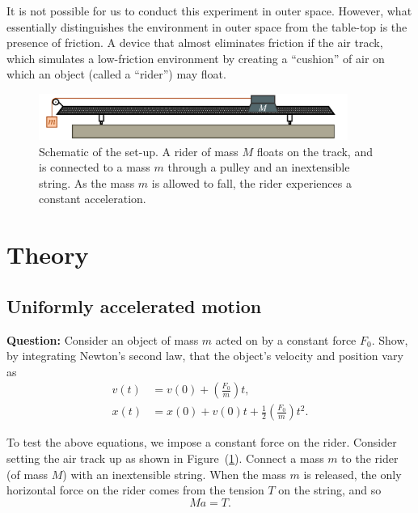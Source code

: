  It is not possible for us to conduct this experiment in outer space. However, what essentially distinguishes the environment in outer space from the table-top is the presence of friction. A device that almost eliminates friction if the air track, which simulates a low-friction environment by creating a ``cushion'' of air on which an object (called a ``rider'') may float. 
 
\begin{figure}[!htb]
     \centering
     \includegraphics[width=0.9\textwidth]{figs/airtrack/airtrack-setup.png}
     \caption{Schematic of the set-up. A rider of mass $M$ floats on the track, and is connected to a mass $m$ through a pulley and an inextensible string. As the mass $m$ is allowed to fall, the rider experiences a constant acceleration. }
     \label{fig:airtrack}
 \end{figure}

\section*{Theory}

\subsection*{Uniformly accelerated motion}

\begin{question}
    \textbf{Question:} Consider an object of mass $m$ acted on by a constant force $F_0$. Show, by integrating Newton's second law, that the object's velocity and position vary as
    \begin{equation}
    \begin{aligned}
     v(t) &= v(0) + \left(\frac{F_0}{m}\right) t,\\
     x(t) &= x(0) + v(0) t + \frac{1}{2} \left(\frac{F_0}{m}\right) t^2.
    \end{aligned}
    \end{equation}
\end{question}

To test the above equations, we impose a constant force on the rider. Consider setting the air track up as shown in Figure~(\ref{fig:airtrack}). Connect a mass $m$ to the rider (of mass $M$) with an inextensible string. When the mass $m$ is released, the only horizontal force on the rider comes from the tension $T$ on the string, and so 
\begin{equation}
M a = T.
\end{equation}

